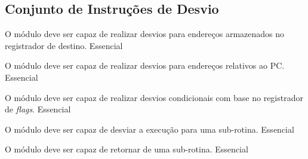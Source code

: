 \subsection{Conjunto de Instruções de Desvio}
	    
	  \begin{functional}
		{O módulo deve ser capaz de realizar desvios para endereços armazenados no registrador de destino.}
		{Essencial} 
		 
		 {O módulo deve ser capaz de realizar desvios para endereços relativos ao PC.}
		 {Essencial}
		 
		 {O módulo deve ser capaz de realizar desvios condicionais com base no registrador de \textit{flags}.}
		 {Essencial}
		 
		 {O módulo deve ser capaz de desviar a execução para uma sub-rotina.}
		 {Essencial}
		 
		 {O módulo deve ser capaz de retornar de uma sub-rotina.}
		 {Essencial}
         
	  \end{functional}